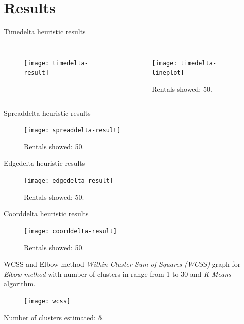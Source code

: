 \documentclass{beamer}
\begin{document}
\section{Results}
\begin{frame}{Timedelta heuristic results}
\begin{columns}[t, onlytextwidth]
	\begin{figure}[bt]
		\centering
		\texttt{[image: timedelta-result]}
		\label{fig:timedelta-result}
	\end{figure}
	\begin{figure}[bt]
		\centering
		\texttt{[image: timedelta-lineplot]}
		\label{fig:timedelta-lineplot}
		\caption{Rentals showed: 50.}
	\end{figure}
\end{columns}
\end{frame}

\begin{frame}{Spreaddelta heuristic results}
	\begin{figure}[bt]
		\centering
		\texttt{[image: spreaddelta-result]}
		\label{fig:spreaddelta-result}
		\caption{Rentals showed: 50.}
	\end{figure}
\end{frame}

\begin{frame}{Edgedelta heuristic results}
\begin{figure}[bt]
	\centering
	\texttt{[image: edgedelta-result]}
	\label{fig:edgedelta-result}
	\caption{Rentals showed: 50.}
\end{figure}
\end{frame}

\begin{frame}{Coorddelta heuristic results}
\begin{figure}[bt]
	\centering
	\texttt{[image: coorddelta-result]}
	\label{fig:coorddelta-result}
	\caption{Rentals showed: 50.}
\end{figure}
\end{frame}

\begin{frame}{WCSS and Elbow method}
\textit{Within Cluster Sum of Squares (WCSS)} graph for \textit{Elbow method} with number of clusters in range from 1 to 30 and \textit{K-Means} algorithm.
\begin{figure}[bt]
	\centering
	\texttt{[image: wcss]}
	\label{fig:wcss}
\end{figure}
Number of clusters estimated: \textbf{5}.
\end{frame}
\end{document}
